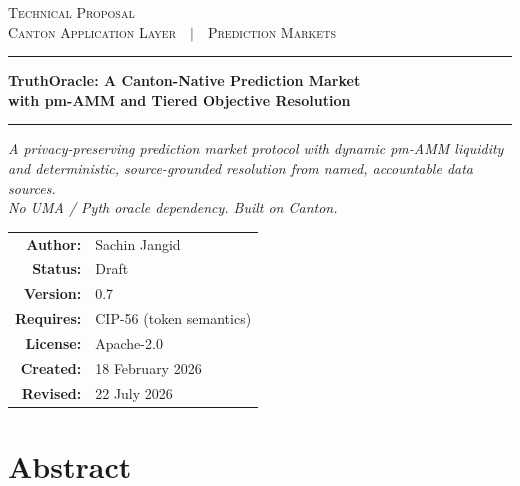 \documentclass[11pt,a4paper]{article}
\begin{document}
\thispagestyle{empty}
\vspace*{2cm}

\begin{center}
{\scshape Technical Proposal}\\[3pt]
{\footnotesize\scshape Canton Application Layer\ \ $\vert$\ \ Prediction Markets}
\end{center}

\vspace{1.5cm}
\noindent\rule{\linewidth}{0.4pt}

\vspace{0.5cm}
\begin{center}
{\Large\bfseries TruthOracle: A Canton-Native Prediction Market\\ with pm-AMM and Tiered Objective Resolution\par}
\end{center}

\vspace{0.4cm}
\noindent\rule{\linewidth}{0.4pt}

\vspace{1.5cm}
\begin{center}
\itshape
A privacy-preserving prediction market protocol with dynamic pm-AMM liquidity\\
and deterministic, source-grounded resolution from named, accountable data sources.\\
No UMA / Pyth oracle dependency. Built on Canton.
\end{center}

\vspace{2cm}
\begin{center}
\begin{tabular}{r l}
\textbf{Author:} & Sachin Jangid \\[6pt]
\textbf{Status:}  & Draft \\
\textbf{Version:} & 0.7 \\
\textbf{Requires:} & CIP-56 (token semantics) \\
\textbf{License:} & Apache-2.0 \\[6pt]
\textbf{Created:} & 18 February 2026 \\
\textbf{Revised:} & 22 July 2026 \\
\end{tabular}
\end{center}
\vfill

\newpage

\section{Abstract}
\end{document}
